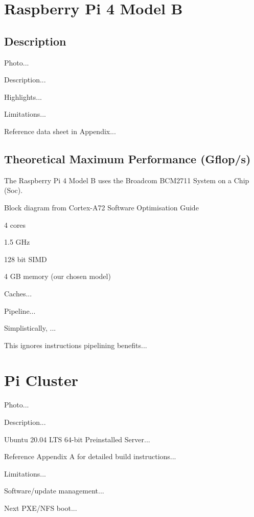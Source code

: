 \documentclass{article}
\begin{document}





\section{Raspberry Pi 4 Model B}

\subsection{Description}

Photo...

Description...

Highlights...

Limitations...

Reference data sheet in Appendix...



\subsection{Theoretical Maximum Performance (Gflop/s)}

The Raspberry Pi 4 Model B uses the Broadcom BCM2711 System on a Chip (Soc).

Block diagram from Cortex-A72 Software Optimisation Guide

4 cores

1.5 GHz

128 bit SIMD

4 GB memory (our chosen model)

Caches...

Pipeline...

Simplistically, ...

This ignores instructions pipelining benefits...



\section{Pi Cluster}

Photo...

Description...

Ubuntu 20.04 LTS 64-bit Preinstalled Server...

Reference Appendix A for detailed build instructions...

Limitations...

Software/update management...

Next PXE/NFS boot...
\end{document}
